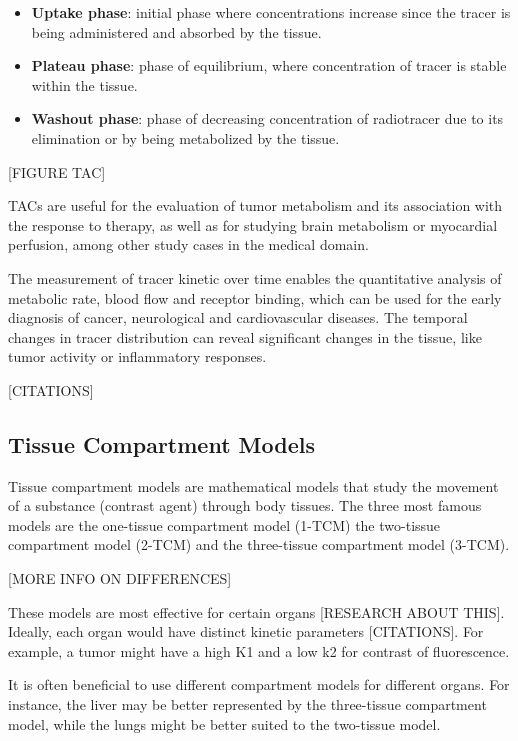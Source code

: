 \begin{itemize}
    \item \textbf{Uptake phase}: initial phase where concentrations increase since the tracer is being administered and absorbed by the tissue.
    \item \textbf{Plateau phase}: phase of equilibrium, where concentration of tracer is stable within the tissue.
    \item \textbf{Washout phase}: phase of decreasing concentration of radiotracer due to its elimination or by being metabolized by the tissue.
\end{itemize}

[FIGURE TAC]

TACs are useful for the evaluation of tumor metabolism and its association with the response to therapy, as well as for studying brain metabolism or myocardial perfusion, among other study cases in the medical domain.

The measurement of tracer kinetic over time enables the quantitative analysis of metabolic rate, blood flow and receptor binding, which can be used for the early diagnosis of cancer, neurological and cardiovascular diseases. The temporal changes in tracer distribution can reveal significant changes in the tissue, like tumor activity or inflammatory responses.

[CITATIONS]


\subsection{Tissue Compartment Models}

Tissue compartment models are mathematical models that study the movement of a substance (contrast agent) through body tissues. The three most famous models are the one-tissue compartment model (1-TCM) the two-tissue compartment model (2-TCM) and the three-tissue compartment model (3-TCM).

[MORE INFO ON DIFFERENCES]

These models are most effective for certain organs [RESEARCH ABOUT THIS]. Ideally, each organ would have distinct kinetic parameters [CITATIONS]. For example, a tumor might have a high K1 and a low k2 for contrast of fluorescence.

It is often beneficial to use different compartment models for different organs. For instance, the liver may be better represented by the three-tissue compartment model, while the lungs might be better suited to the two-tissue model.

